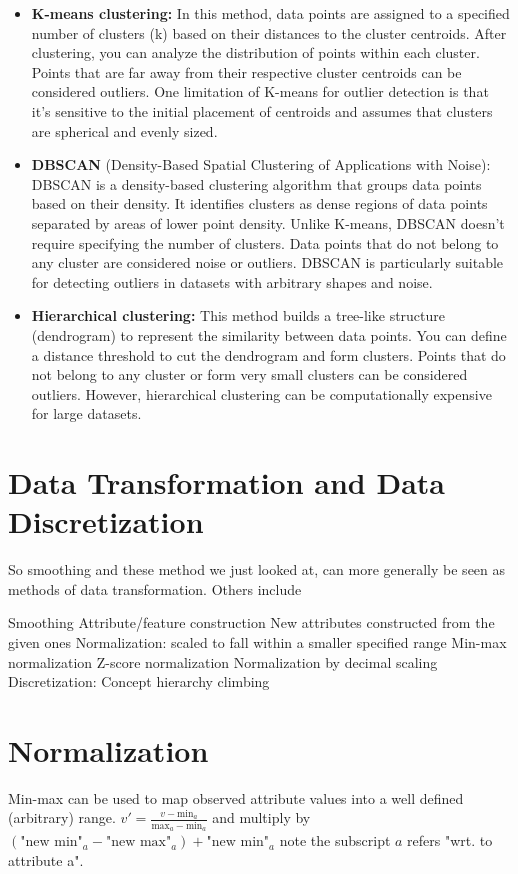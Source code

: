 \documentclass{article}
\begin{document}
\begin{itemize}
	\item {\bf K-means clustering:} In this method, data points are assigned to a specified number of clusters (k) based on their distances to the cluster centroids. After clustering, you can analyze the distribution of points within each cluster. Points that are far away from their respective cluster centroids can be considered outliers. One limitation of K-means for outlier detection is that it's sensitive to the initial placement of centroids and assumes that clusters are spherical and evenly sized.
	\item {\bf DBSCAN} (Density-Based Spatial Clustering of Applications with Noise): DBSCAN is a density-based clustering algorithm that groups data points based on their density. It identifies clusters as dense regions of data points separated by areas of lower point density. Unlike K-means, DBSCAN doesn't require specifying the number of clusters. Data points that do not belong to any cluster are considered noise or outliers. DBSCAN is particularly suitable for detecting outliers in datasets with arbitrary shapes and noise.
	\item {\bf Hierarchical clustering: } This method builds a tree-like structure (dendrogram) to represent the similarity between data points. You can define a distance threshold to cut the dendrogram and form clusters. Points that do not belong to any cluster or form very small clusters can be considered outliers. However, hierarchical clustering can be computationally expensive for large datasets.
\end{itemize}

\section{Data Transformation and Data Discretization}
So smoothing and these method we just looked at, can more generally be seen as methods of data transformation. Others include

\begin{outline}
	\1 Smoothing
	\1 Attribute/feature construction
		\2 New attributes constructed from the given ones
	\1 Normalization: scaled to fall within a smaller specified range
		\2 Min-max normalization
		\2 Z-score normalization
		\2 Normalization by decimal scaling
	\1 Discretization: Concept hierarchy climbing
\end{outline}

\section{Normalization}
Min-max can be used to map observed attribute values into a well defined (arbitrary) range. $v\prime = \frac{v - \text{min}_a}{\text{max}_a - \text{min}_a}$
and multiply by $ (\text{"new min"}_a - \text{"new max"}_a)  + \text{"new min"}_a$ note the subscript $a$ refers "wrt. to attribute a".
\end{document}
